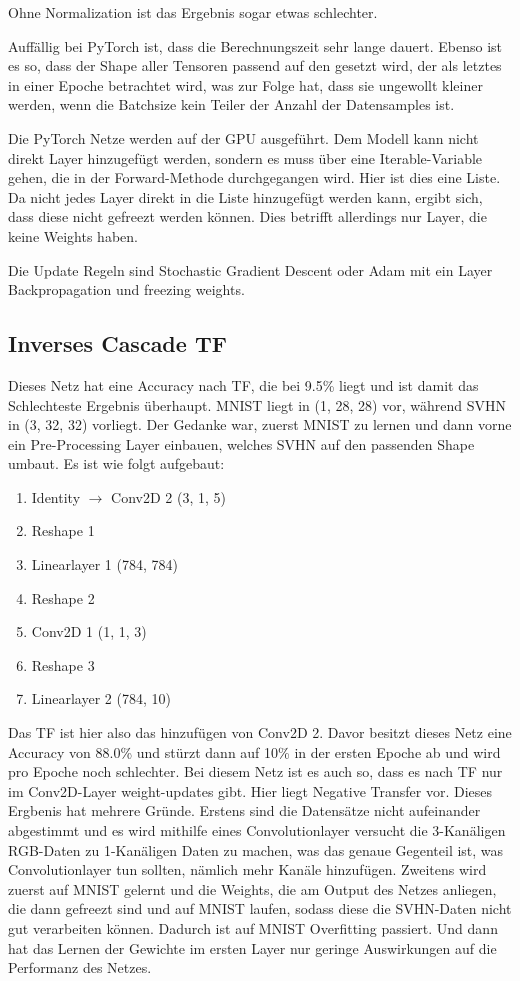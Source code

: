     Ohne Normalization ist das Ergebnis sogar etwas schlechter. 

    Auffällig bei PyTorch ist, dass die Berechnungszeit sehr lange dauert.
    Ebenso ist es so, dass der Shape aller Tensoren passend auf den gesetzt wird, der 
    als letztes in einer Epoche betrachtet wird, was zur Folge hat, dass sie ungewollt 
    kleiner werden, wenn die Batchsize kein Teiler der Anzahl der Datensamples ist. 

    Die PyTorch Netze werden auf der GPU ausgeführt. Dem Modell kann nicht direkt 
    Layer hinzugefügt werden, sondern es muss über eine Iterable-Variable gehen, 
    die in der Forward-Methode durchgegangen wird. Hier ist dies eine Liste. 
    Da nicht jedes Layer direkt in die Liste hinzugefügt werden kann, ergibt sich, 
    dass diese nicht gefreezt werden können. Dies betrifft allerdings nur Layer, die 
    keine Weights haben. 

    Die Update Regeln sind Stochastic Gradient Descent oder Adam mit ein Layer 
    Backpropagation und freezing weights.

\subsection{Inverses Cascade TF}
    Dieses Netz hat eine Accuracy nach TF, die bei 9.5\% liegt und ist damit das 
    Schlechteste Ergebnis überhaupt. MNIST liegt in (1, 28, 28) vor, während 
    SVHN in (3, 32, 32) vorliegt. Der Gedanke war, zuerst MNIST zu lernen und dann 
    vorne ein Pre-Processing Layer einbauen, welches SVHN auf den passenden Shape 
    umbaut. 
    Es ist wie folgt aufgebaut: 
    \begin{enumerate}
        \item Identity $\rightarrow$ Conv2D 2 (3, 1, 5)
        \item Reshape 1
        \item Linearlayer 1 (784, 784)
        \item Reshape 2
        \item Conv2D 1 (1, 1, 3)
        \item Reshape 3
        \item Linearlayer 2 (784, 10)
    \end{enumerate}
    Das TF ist hier also das hinzufügen von Conv2D 2. Davor besitzt dieses Netz eine 
    Accuracy von 88.0\% und stürzt dann auf 10\% in der ersten Epoche ab und wird pro 
    Epoche noch schlechter. Bei diesem Netz ist es auch so, dass es nach TF nur im 
    Conv2D-Layer weight-updates gibt. Hier liegt Negative Transfer vor. 
    Dieses Ergbenis hat mehrere Gründe. Erstens sind die Datensätze nicht
    aufeinander abgestimmt und es wird mithilfe eines Convolutionlayer versucht die 
    3-Kanäligen RGB-Daten zu 1-Kanäligen Daten zu machen, was das genaue Gegenteil ist, 
    was Convolutionlayer tun sollten, nämlich mehr Kanäle hinzufügen. Zweitens wird 
    zuerst auf MNIST gelernt und die Weights, die am Output des Netzes anliegen, die 
    dann gefreezt sind und auf MNIST laufen, sodass diese die SVHN-Daten nicht gut 
    verarbeiten können. Dadurch ist auf MNIST Overfitting passiert. Und dann hat 
    das Lernen der Gewichte im ersten Layer nur geringe Auswirkungen auf die Performanz 
    des Netzes.

